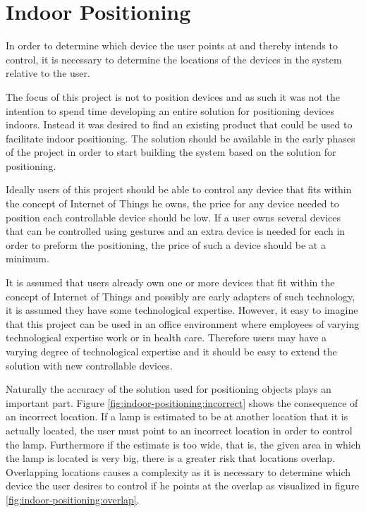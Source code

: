\section{Indoor Positioning}\label{sec:indoor-positioning}

In order to determine which device the user points at and thereby intends to control, 
it is necessary to determine the locations of the devices in the system relative to the user.

The focus of this project is not to position devices and as such it was not the intention to spend time developing an entire solution for positioning devices indoors. 
Instead it was desired to find an existing product that could be used to facilitate indoor positioning.
The solution should be available in the early phases of the project in order to start building the system based on the solution for positioning.

Ideally users of this project should be able to control any device that fits within the concept of Internet of Things he owns, 
the price for any device needed to position each controllable device should be low. 
If a user owns several devices that can be controlled using gestures and an extra device is needed for each in order to preform the positioning, 
the price of such a device should be at a minimum.

It is assumed that users already own one or more devices that fit within the concept of Internet of Things and possibly are early adapters of such technology, 
it is assumed they have some technological expertise. 
However, it easy to imagine that this project can be used in an office environment where employees of varying technological expertise work or in health care. 
Therefore users may have a varying degree of technological expertise and it should be easy to extend the solution with new controllable devices.

Naturally the accuracy of the solution used for positioning objects plays an important part. 
Figure \ref{fig:indoor-positioning:incorrect} shows the consequence of an incorrect location. 
If a lamp is estimated to be at another location that it is actually located, 
the user must point to an incorrect location in order to control the lamp.
Furthermore if the estimate is too wide, that is, the given area in which the lamp is located is very big, 
there is a greater risk that locations overlap. 
Overlapping locations causes a complexity as it is necessary to determine which device the user desires to control if he points at the overlap as visualized in figure \ref{fig:indoor-positioning:overlap}.

